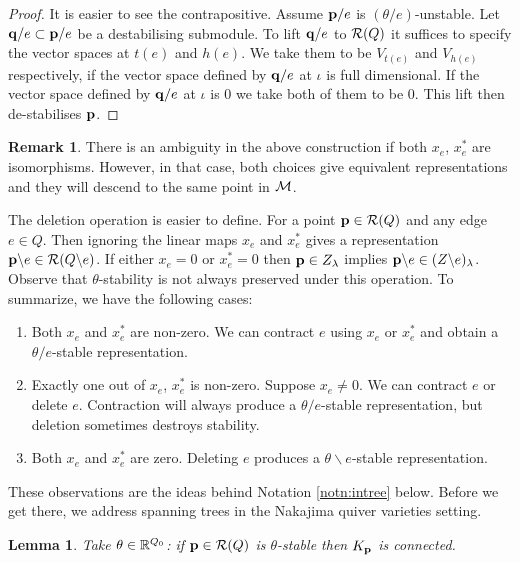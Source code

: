 \documentclass{amsart}
\newtheorem{lem}[thm]{Lemma}
\theoremstyle{definition}
\newtheorem{rem}[thm]{Remark}
\begin{document}
\begin{proof}
It is easier to see the contrapositive.
Assume $\mathbf{p}/e$ is $(\theta/e)$-unstable.
Let $\mathbf{q}/e \subset \mathbf{p}/e$ be a destabilising submodule.
To lift $\mathbf{q}/e$ to $\mathcal{R}(Q)$ it suffices to specify the vector spaces at $t(e)$ and $h(e)$.
We take them to be $V_{t(e)}$ and $V_{h(e)}$ respectively, if the vector space defined by $\mathbf{q}/e$ at $\iota$ is full dimensional.
If the vector space defined by $\mathbf{q}/e$ at $\iota$ is $0$ we take both of them to be $0$.
This lift then de-stabilises $\mathbf{p}$.
\end{proof}

\begin{rem}
There is an ambiguity in the above construction if both $x_e$, $x_e^*$ are isomorphisms.
However, in that case, both choices give equivalent representations and they will descend to the same point in $\mathcal{M}$.
\end{rem}

The deletion operation is easier to define.
For a point $\mathbf{p} \in \mathcal{R}(Q)$ and any edge $e \in Q$. Then ignoring the linear maps $x_e$ and $x_e^*$ gives a representation $\mathbf{p} \backslash e \in \mathcal{R}(Q\backslash e)$. If either $x_e=0$ or $x_e^*=0$ then $\mathbf{p} \in Z_\lambda$ implies $\mathbf{p} \backslash e \in (Z\backslash e)_\lambda$. Observe that $\theta$-stability is not always preserved under this operation. To summarize, we have the following cases:

\begin{enumerate}
    \item Both $x_e$ and $x_e^*$ are non-zero. We can contract $e$ using $x_e$ or $x_e^*$ and obtain a $\theta/e$-stable representation.
    \item Exactly one out of $x_e$, $x_e^*$ is non-zero. Suppose $x_e\neq 0$. We can contract $e$ or delete $e$. Contraction will always produce a $\theta/e$-stable representation, but deletion sometimes destroys stability.
    \item Both $x_e$ and $x_e^*$ are zero. Deleting $e$ produces a $\theta\backslash e$-stable representation.
\end{enumerate}

These observations are the ideas behind Notation \ref{notn:intree} below. 
Before we get there, we address spanning trees in the Nakajima quiver varieties setting.

\begin{lem}\label{lm:coninvgr2}
Take $\theta \in \mathbb{R}^{Q_0}$: if $\mathbf{p} \in \mathcal{R}(Q)$ is $\theta$-stable then $K_{\mathbf{p}}$ is connected.
\end{lem}
\end{document}

